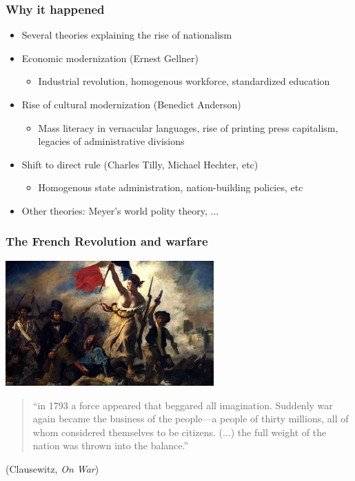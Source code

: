 \documentclass[utf8, xcolor=dvipsnames]{beamer}
\begin{document}
\begin{frame}
\frametitle{Why it happened}
\centering

\begin{itemize}[<+->]
  \item Several theories explaining the rise of nationalism
  \item Economic modernization (Ernest Gellner)
  \begin{itemize}
    \item Industrial revolution, homogenous workforce, standardized education
  \end{itemize}
  \item Rise of cultural modernization (Benedict Anderson)
  \begin{itemize}
    \item Mass literacy in vernacular languages, rise of printing press capitalism, legacies of administrative divisions
  \end{itemize}
  \item Shift to direct rule (Charles Tilly, Michael Hechter, etc)
  \begin{itemize}
    \item Homogenous state administration, nation-building policies, etc
  \end{itemize}
  \item Other theories: Meyer's world polity theory, ...
\end{itemize}

\end{frame}

\begin{frame}
\frametitle{The French Revolution and warfare}
\centering

\includegraphics[width = 0.6\textwidth]{img/delacroix}


\vspace{15pt}

\begin{quote}
  {\small ``in 1793 a force appeared that beggared all imagination. Suddenly war again became the business of the people---a people of thirty millions, all of whom considered themselves to be citizens. (...) the full weight of the nation was thrown into the balance.''}
\end{quote}

{\small (Clausewitz, \textit{On War})}

\end{frame}
\end{document}
